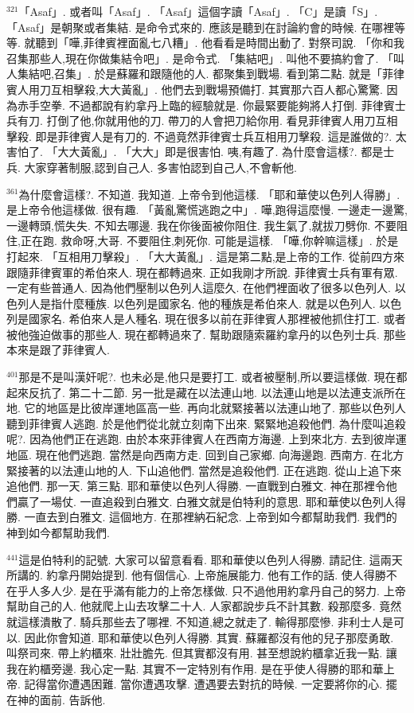 \documentclass{book}
\begin{document}
$^{321}$「Asaf」.
或者叫「Asaf」.
「Asaf」這個字讀「Asaf」.
「C」是讀「S」.
「Asaf」是朝聚或者集結.
是命令式來的.
應該是聽到在討論約會的時候.
在哪裡等等.
就聽到「嘩,菲律賓裡面亂七八糟」.
他看看是時間出動了.
對祭司說.
「你和我召集那些人,現在你做集結令吧」.
是命令式.
「集結吧」.
叫他不要搞約會了.
「叫人集結吧,召集」.
於是蘇羅和跟隨他的人.
都聚集到戰場.
看到第二點.
就是「菲律賓人用刀互相擊殺,大大黃亂」.
他們去到戰場預備打.
其實那六百人都心驚驚.
因為赤手空拳.
不過都說有約拿丹上臨的經驗就是.
你最緊要能夠將人打倒.
菲律賓士兵有刀.
打倒了他,你就用他的刀.
帶刀的人會把刀給你用.
看見菲律賓人用刀互相擊殺.
即是菲律賓人是有刀的.
不過竟然菲律賓士兵互相用刀擊殺.
這是誰做的?.
太害怕了.
「大大黃亂」.
「大大」即是很害怕.
咦,有趣了.
為什麼會這樣?.
都是士兵.
大家穿著制服,認到自己人.
多害怕認到自己人,不會斬他.

$^{361}$為什麼會這樣?.
不知道.
我知道.
上帝令到他這樣.
「耶和華使以色列人得勝」.
是上帝令他這樣做.
很有趣.
「黃亂驚慌逃跑之中」.
嘩,跑得這麼慢.
一邊走一邊驚,一邊轉頭,慌失失.
不知去哪邊.
我在你後面被你阻住.
我生氣了,就拔刀劈你.
不要阻住,正在跑.
救命呀,大哥.
不要阻住,刺死你.
可能是這樣.
「嘩,你幹嘛這樣」.
於是打起來.
「互相用刀擊殺」.
「大大黃亂」.
這是第二點,是上帝的工作.
從前四方來跟隨菲律賓軍的希伯來人.
現在都轉過來.
正如我剛才所說.
菲律賓士兵有軍有眾.
一定有些普通人.
因為他們壓制以色列人這麼久.
在他們裡面收了很多以色列人.
以色列人是指什麼種族.
以色列是國家名.
他的種族是希伯來人.
就是以色列人.
以色列是國家名.
希伯來人是人種名.
現在很多以前在菲律賓人那裡被他抓住打工.
或者被他強迫做事的那些人.
現在都轉過來了.
幫助跟隨索羅約拿丹的以色列士兵.
那些本來是跟了菲律賓人.

$^{401}$那是不是叫漢奸呢?.
也未必是,他只是要打工.
或者被壓制,所以要這樣做.
現在都起來反抗了.
第二十二節.
另一批是藏在以法連山地.
以法連山地是以法連支派所在地.
它的地區是比彼岸運地區高一些.
再向北就緊接著以法連山地了.
那些以色列人聽到菲律賓人逃跑.
於是他們從北就立刻南下出來.
緊緊地追殺他們.
為什麼叫追殺呢?.
因為他們正在逃跑.
由於本來菲律賓人在西南方海邊.
上到來北方.
去到彼岸運地區.
現在他們逃跑.
當然是向西南方走.
回到自己家鄉.
向海邊跑.
西南方.
在北方緊接著的以法連山地的人.
下山追他們.
當然是追殺他們.
正在逃跑.
從山上追下來追他們.
那一天.
第三點.
耶和華使以色列人得勝.
一直戰到白雅文.
神在那裡令他們贏了一場仗.
一直追殺到白雅文.
白雅文就是伯特利的意思.
耶和華使以色列人得勝.
一直去到白雅文.
這個地方.
在那裡納石紀念.
上帝到如今都幫助我們.
我們的神到如今都幫助我們.

$^{441}$這是伯特利的記號.
大家可以留意看看.
耶和華使以色列人得勝.
請記住.
這兩天所講的.
約拿丹開始提到.
他有個信心.
上帝施展能力.
他有工作的話.
使人得勝不在乎人多人少.
是在乎滿有能力的上帝怎樣做.
只不過他用約拿丹自己的努力.
上帝幫助自己的人.
他就爬上山去攻擊二十人.
人家都說步兵不計其數.
殺那麼多.
竟然就這樣潰散了.
騎兵那些去了哪裡.
不知道,總之就走了.
輸得那麼慘.
非利士人是可以.
因此你會知道.
耶和華使以色列人得勝.
其實.
蘇羅都沒有他的兒子那麼勇敢.
叫祭司來.
帶上約櫃來.
壯壯膽先.
但其實都沒有用.
甚至想說約櫃拿近我一點.
讓我在約櫃旁邊.
我心定一點.
其實不一定特別有作用.
是在乎使人得勝的耶和華上帝.
記得當你遭遇困難.
當你遭遇攻擊.
遭遇要去對抗的時候.
一定要將你的心.
擺在神的面前.
告訴他.
\end{document}
